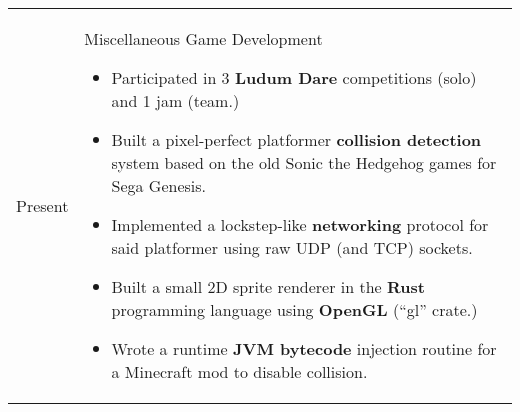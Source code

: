 \documentclass[12pt]{article}
\newenvironment{timeline}
        {\begin{tabular}{p{21 mm}|p{150 mm}}}
        {\end{tabular}}
\newenvironment{timelinetitle}
        {\vspace{-2 mm}\begin{large}}
        {\end{large}\vspace{-1.5 mm}}
\newcommand{\timespan}[2]{{#2}\newline{#1}}
\begin{document}
\begin{timeline}
\timespan{2011}{Present}
&
\begin{timelinetitle}
    Miscellaneous Game Development
\end{timelinetitle}
\begin{itemize}
  \item Participated in 3 \textbf{Ludum Dare} competitions (solo) and 1 jam (team.)

  \item Built a pixel-perfect platformer \textbf{collision detection} system based on
        the old Sonic the Hedgehog games for Sega Genesis.

  \item Implemented a lockstep-like \textbf{networking} protocol for said platformer
        using raw UDP (and TCP) sockets.

  \item Built a small 2D sprite renderer in the \textbf{Rust} programming language using
        \textbf{OpenGL} (``gl'' crate.)

  \item Wrote a runtime \textbf{JVM bytecode} injection routine for a Minecraft mod to disable
        collision.
\end{itemize}

\end{timeline}
\end{document}
